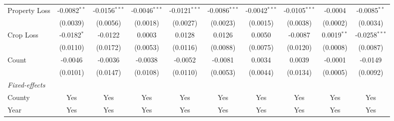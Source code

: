\documentclass[letterpaper]{article}
\begin{document}
\begin{table}[H]
{\begin{tabular}{lccccccccc}
   Property Loss                 & -0.0082$^{**}$                    & -0.0156$^{***}$                  & -0.0046$^{***}$                    & -0.0121$^{***}$                    & -0.0086$^{***}$              & -0.0042$^{***}$                  & -0.0105$^{***}$             & -0.0004                    & -0.0085$^{**}$\\   
                        & (0.0039)                          & (0.0056)                         & (0.0018)                           & (0.0027)                           & (0.0023)                     & (0.0015)                         & (0.0038)                    & (0.0002)                   & (0.0034)\\   
   Crop Loss                & -0.0182$^{*}$                     & -0.0122                          & 0.0003                             & 0.0128                             & 0.0126                       & 0.0050                           & -0.0087                     & 0.0019$^{**}$              & -0.0258$^{***}$\\   
                        & (0.0110)                          & (0.0172)                         & (0.0053)                           & (0.0116)                           & (0.0088)                     & (0.0075)                         & (0.0120)                    & (0.0008)                   & (0.0087)\\   
   Count                & -0.0046                           & -0.0036                          & -0.0038                            & -0.0052                            & -0.0081                      & 0.0034                           & 0.0039                      & -0.0001                    & -0.0149\\   
                        & (0.0101)                          & (0.0147)                         & (0.0108)                           & (0.0110)                           & (0.0053)                     & (0.0044)                         & (0.0134)                    & (0.0005)                   & (0.0092)\\    
   \midrule
   \emph{Fixed-effects}\\
   County               & Yes                            & Yes                           & Yes                             & Yes                             & Yes                       & Yes                           & Yes                      & Yes                     & Yes\\  
   Year                 & Yes                            & Yes                           & Yes                             & Yes                             & Yes                       & Yes                           & Yes                      & Yes                     & Yes\\  

\end{tabular}}
\end{table}
\end{document}
